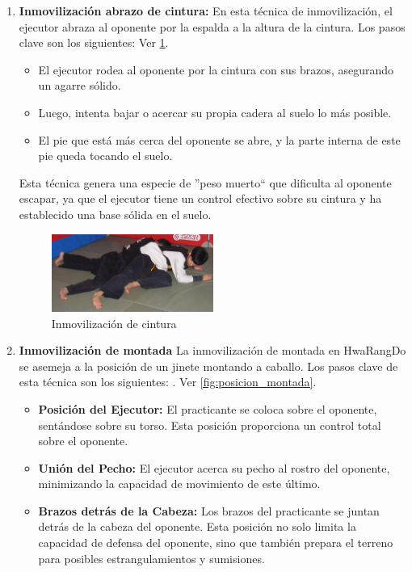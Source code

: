 \begin{enumerate}
	\item \textbf{Inmovilización abrazo de cintura:} En esta técnica de inmovilización, el ejecutor abraza al oponente por la espalda a la altura de la cintura. Los pasos clave son los siguientes: Ver \ref{fig:posicion_abrazo_cintura}.

	\begin{itemize}
		\item El ejecutor rodea al oponente por la cintura con sus brazos, asegurando un agarre sólido.
		\item Luego, intenta bajar o acercar su propia cadera al suelo lo más posible.
		\item El pie que está más cerca del oponente se abre, y la parte interna de este pie queda tocando el suelo.
	\end{itemize}

	Esta técnica genera una especie de ''peso muerto`` que dificulta al oponente escapar, ya que el ejecutor tiene un control efectivo sobre su cintura y ha establecido una base sólida en el suelo.

	\begin{figure}[h]
		\centering
		\includegraphics[width=0.5\textwidth]{images/Lucha_de_Piso/11_inmovilizacion_abrazo_cintura.png}
		\caption{Inmovilización de cintura}
		\label{fig:posicion_abrazo_cintura}
	\end{figure}

	\item \textbf{Inmovilización de montada} La inmovilización de montada en HwaRangDo se asemeja a la posición de un jinete montando a caballo. Los pasos clave de esta técnica son los siguientes: . Ver \ref{fig:posicion_montada}.

	\begin{itemize}
		\item \textbf{Posición del Ejecutor:} El practicante se coloca sobre el oponente, sentándose sobre su torso. Esta posición proporciona un control total sobre el oponente.
		\item \textbf{Unión del Pecho:} El ejecutor acerca su pecho al rostro del oponente, minimizando la capacidad de movimiento de este último.
		\item \textbf{Brazos detrás de la Cabeza:} Los brazos del practicante se juntan detrás de la cabeza del oponente. Esta posición no solo limita la capacidad de defensa del oponente, sino que también prepara el terreno para posibles estrangulamientos y sumisiones.
	\end{itemize}


\end{enumerate}
